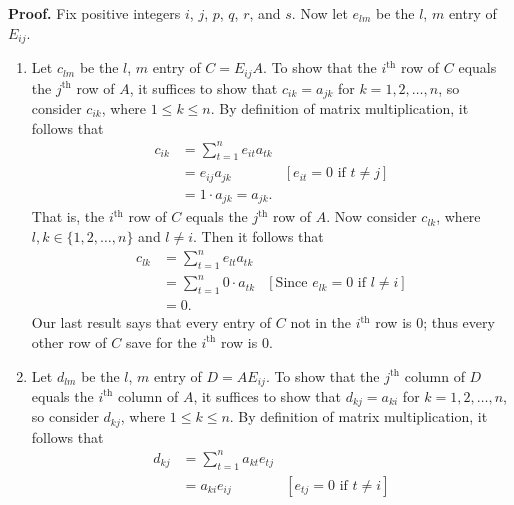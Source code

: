 \documentclass[9pt]{article}
\begin{document}
\begin{enumerate}
      \textbf{Proof.} Fix positive integers $i$, $j$, $p$, $q$, $r$, and $s$.
      Now let $e_{lm}$ be the $l$, $m$ entry of $E_{ij}$.
      \begin{enumerate}
         \item Let $c_{lm}$ be the $l$, $m$ entry of $C = E_{ij}A$. To show that 
               the $i^{\text{th}}$ row of $C$ equals the $j^{\text{th}}$ row of
               $A$, it suffices to show that $c_{ik} = a_{jk}$ for
               $k = 1, 2, \ldots, n$, so consider $c_{ik}$,
               where $1 \le k \le n$. By definition of matrix multiplication, it 
               follows that
               \begin{align*}
                  c_{ik} &= \sum_{t=1}^ne_{it}a_{tk} \\
                         &= e_{ij}a_{jk} &[e_{it} = 0 \text{ if } t \neq j] \\
                         &= 1 \cdot a_{jk} = a_{jk}.
               \end{align*}
               That is, the $i^{\text{th}}$ row of $C$ equals the
               $j^{\text{th}}$ row of $A$. Now consider $c_{lk}$, where
               $l, k \in \{1, 2, \ldots, n\}$ and $l \neq i$. Then it follows
               that
               \begin{align*}
                  c_{lk} &= \sum_{t=1}^ne_{lt}a_{tk} \\
                         &= \sum_{t=1}^n0 \cdot a_{tk} &[\text{Since }e_{lk} = 0
                            \text{ if } l \neq i] \\
                         &= 0.
               \end{align*}
               Our last result says that every entry of $C$ not in the
               $i^{\text{th}}$ row is 0; thus every other row of $C$ save for
               the $i^{\text{th}}$ row is 0.
         \item Let $d_{lm}$ be the $l$, $m$ entry of $D = AE_{ij}$. To show that 
               the $j^{\text{th}}$ column of $D$ equals the $i^{\text{th}}$
               column of $A$, it suffices to show that $d_{kj} = a_{ki}$ for
               $k = 1, 2, \ldots, n$, so consider $d_{kj}$,
               where $1 \le k \le n$. By definition of matrix multiplication, it 
               follows that
               \begin{align*}
                  d_{kj} &= \sum_{t=1}^na_{kt}e_{tj} \\
                         &= a_{ki}e_{ij} &[e_{tj} = 0 \text{ if } t \neq i] \\

\end{align*}
\end{enumerate}
\end{enumerate}
\end{document}
